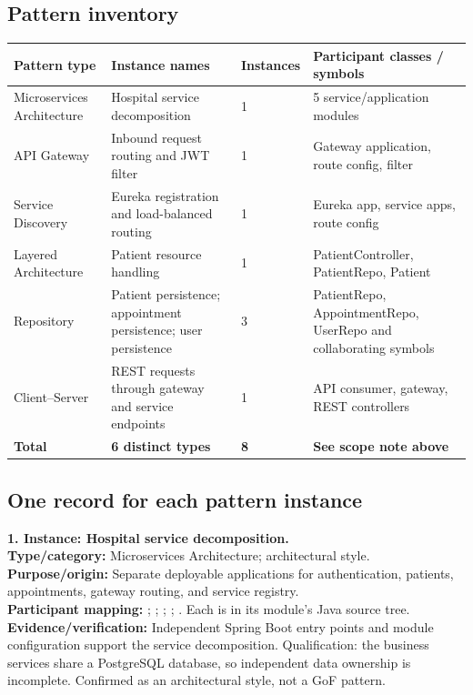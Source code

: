 \documentclass[11pt,a4paper]{article}
\begin{document}
\subsection{Pattern inventory}
\small
\begin{tabularx}{\linewidth}{@{}p{1.35in}X p{0.65in}p{1.65in}@{}}
\toprule\textbf{Pattern type} & \textbf{Instance names} & \textbf{Instances} & \textbf{Participant classes / symbols}\\\midrule
Microservices Architecture & Hospital service decomposition & 1 & 5 service/application modules\\
API Gateway & Inbound request routing and JWT filter & 1 & Gateway application, route config, filter\\
Service Discovery & Eureka registration and load-balanced routing & 1 & Eureka app, service apps, route config\\
Layered Architecture & Patient resource handling & 1 & PatientController, PatientRepo, Patient\\
Repository & Patient persistence; appointment persistence; user persistence & 3 & PatientRepo, AppointmentRepo, UserRepo and collaborating symbols\\
Client--Server & REST requests through gateway and service endpoints & 1 & API consumer, gateway, REST controllers\\
\midrule\textbf{Total} & \textbf{6 distinct types} & \textbf{8} & \textbf{See scope note above}\\
\bottomrule
\end{tabularx}
\normalsize

\subsection{One record for each pattern instance}
\textbf{1. Instance: Hospital service decomposition.}\\
\textbf{Type/category:} Microservices Architecture; architectural style.\\
\textbf{Purpose/origin:} Separate deployable applications for authentication, patients, appointments, gateway routing, and service registry.\\
\textbf{Participant mapping:} ; ; ; ; . Each is in its module's Java source tree.\\
\textbf{Evidence/verification:} Independent Spring Boot entry points and module configuration support the service decomposition. Qualification: the business services share a PostgreSQL database, so independent data ownership is incomplete. Confirmed as an architectural style, not a GoF pattern.
\end{document}
